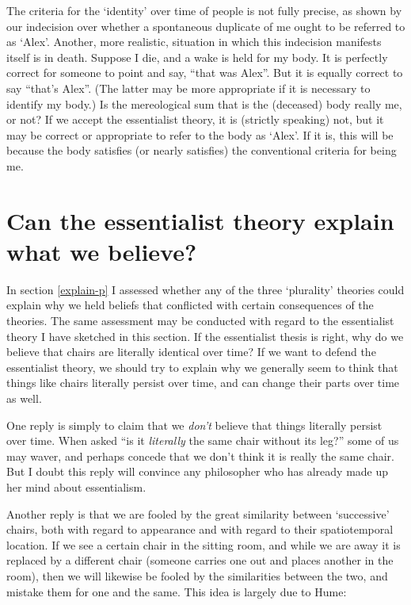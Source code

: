 \documentclass[11pt]{article}
\begin{document}
\begin{spacing}{1.5}
The criteria for the `identity' over time of people is not fully
precise, as shown by our indecision over whether a spontaneous
duplicate of me ought to be referred to as `Alex'.  Another, more
realistic, situation in which this indecision manifests itself is in
death.  Suppose I die, and a wake is held for my body.  It is
perfectly correct for someone to point and say, ``that was Alex''.
But it is equally correct to say ``that's Alex''.  (The latter may be
more appropriate if it is necessary to identify my body.)  Is the
mereological sum that is the (deceased) body really me, or not?  If we
accept the essentialist theory, it is (strictly speaking) not, but it
may be correct or appropriate to refer to the body as `Alex'.  If it
is, this will be because the body satisfies (or nearly satisfies) the
conventional criteria for being me.

\section{Can the essentialist theory explain what we believe?}
\label{explain-e}
In section \ref{explain-p} I assessed whether any of the three
`plurality' theories could explain why we held beliefs that conflicted
with certain consequences of the theories.  The same assessment may
be conducted with regard to the essentialist theory I have sketched in
this section.  If the essentialist thesis is right, why do we believe
that chairs are literally identical over time?  If we want to defend
the essentialist theory, we should try to explain why we generally
seem to think that things like chairs literally persist over time, and
can change their parts over time as well.

One reply is simply to claim that we {\em don't} believe that things
literally persist over time.  When asked ``is it {\em literally} the
same chair without its leg?'' some of us may waver, and perhaps
concede that we don't think it is really the same chair.  But I doubt
this reply will convince any philosopher who has already made up her
mind about essentialism.

Another reply is that we are fooled by the great similarity between
`successive' chairs, both with regard to appearance and with regard to
their spatiotemporal location.  If we see a certain chair in the
sitting room, and while we are away it is replaced by a different
chair (someone carries one out and places another in the room), then
we will likewise be fooled by the similarities between the two, and
mistake them for one and the same.  This idea is largely due to Hume:


\end{spacing}
\end{document}
